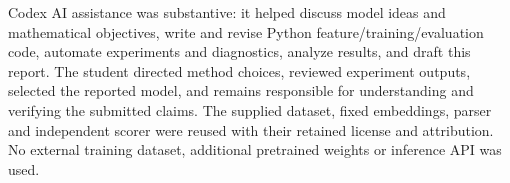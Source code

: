 \documentclass[10pt,a4paper]{article}
\begin{document}
Codex AI assistance was substantive: it helped discuss model ideas and mathematical objectives, write and revise Python feature/training/evaluation code, automate experiments and diagnostics, analyze results, and draft this report. The student directed method choices, reviewed experiment outputs, selected the reported model, and remains responsible for understanding and verifying the submitted claims. The supplied dataset, fixed embeddings, parser and independent scorer were reused with their retained license and attribution. No external training dataset, additional pretrained weights or inference API was used.
\end{document}

